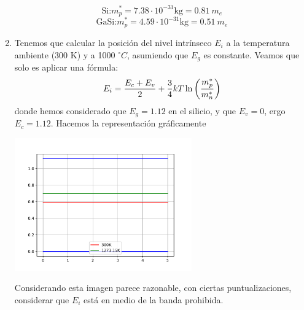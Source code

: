 \begin{texercise}
\begin{enumerate}[label=\alph*)]
		\begin{equation}
			\text{Si:} m_p^* = 7.38\cdot10^{-31} \text{kg} = 0.81 \ {m}_e
		\end{equation}
		\begin{equation}
			\text{GaSi:}m_p^* = 4.59 \cdot10^{-31} \text{kg} = 0.51 \ {m}_e
		\end{equation}
		\item Tenemos que calcular la posición del nivel intrínseco $E_i$ a la temperatura ambiente (300 K) y a 1000 $^\circ C$, asumiendo que $E_g$ es constante. Veamos que solo es aplicar una fórmula:
		\begin{equation}
			E_i = \frac{E_c+E_v}{2} + \frac{3}{4} kT \ln\left( \frac{m_p^*}{m_n^*} \right)
		\end{equation}
		donde hemos considerado que $E_g=1.12$ en el silicio, y que $E_v=0$, ergo $E_c=1.12$. Hacemos la representación gráficamente
		\begin{center}
			\includegraphics[width=0.6\textwidth]{Cuerpo/Ch_01/Ejercicio_01_5.pdf}
		\end{center}
		Considerando esta imagen parece razonable, con ciertas puntualizaciones, considerar que $E_i$ está en medio de la banda prohibida.
	\end{enumerate}
	
\end{texercise}


